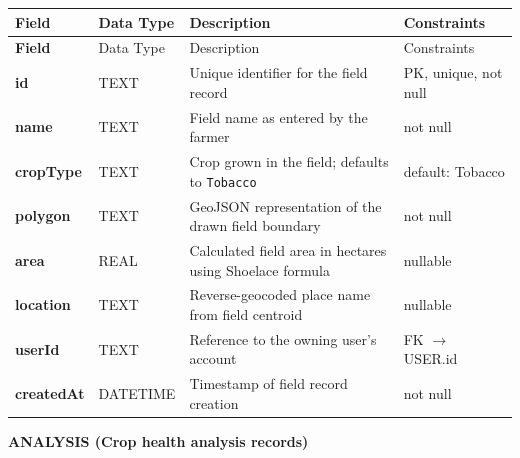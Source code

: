 \begin{longtable}{>{\bfseries}p{3.0cm} p{2.2cm} p{5.5cm} p{2.5cm}}
\toprule
Field & Data Type & Description & Constraints \\
\midrule
\endfirsthead
\toprule
Field & Data Type & Description & Constraints \\
\midrule
\endhead
\bottomrule
\endfoot
id         & TEXT     & Unique identifier for the field record & PK, unique, not null \\[3pt]
name       & TEXT     & Field name as entered by the farmer & not null \\[3pt]
cropType   & TEXT     & Crop grown in the field; defaults to \texttt{Tobacco} & default: Tobacco \\[3pt]
polygon    & TEXT     & GeoJSON representation of the drawn field boundary & not null \\[3pt]
area       & REAL     & Calculated field area in hectares using Shoelace formula & nullable \\[3pt]
location   & TEXT     & Reverse-geocoded place name from field centroid & nullable \\[3pt]
userId     & TEXT     & Reference to the owning user's account & FK $\rightarrow$ USER.id \\[3pt]
createdAt  & DATETIME & Timestamp of field record creation & not null \\[3pt]
\end{longtable}

\vspace{0.5em}
\noindent\textbf{ANALYSIS (Crop health analysis records)}

